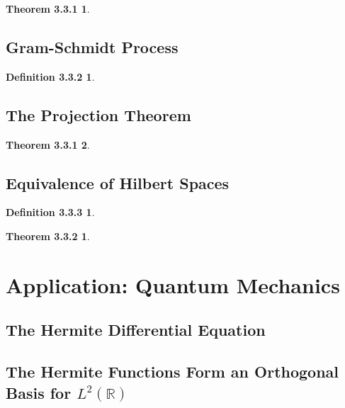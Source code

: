 \documentclass{article}
\theoremstyle{plain}
\newtheorem*{definition332*}{Definition 3.3.2}
\newtheorem*{theorem331*}{Theorem 3.3.1}
\newtheorem*{definition333*}{Definition 3.3.3}
\newtheorem*{theorem332*}{Theorem 3.3.2}
\begin{document}
\begin{theorem331*} 
\end{theorem331*}

\subsection*{Gram-Schmidt Process}


\begin{definition332*} 
\end{definition332*}


\subsection*{The Projection Theorem}

\begin{theorem331*}  \\
\end{theorem331*}

\subsection*{Equivalence of Hilbert Spaces}

\begin{definition333*} 
\end{definition333*}

\begin{theorem332*}
\end{theorem332*}

\section*{Application: Quantum Mechanics}
\subsection*{The Hermite Differential Equation}
\subsection*{The Hermite Functions Form an Orthogonal Basis for $ L^{2}\left(\mathbb{R}\right) $}
\end{document}
